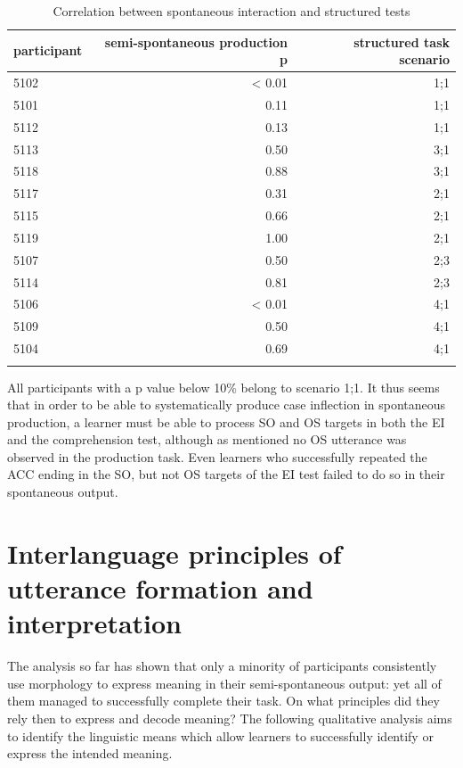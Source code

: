 \begin{table}
    \begin{tabularx}{\textwidth}{Xrr}
        \lsptoprule
         participant & semi-spontaneous production p & structured task scenario\\
         \midrule
         5102 & < 0.01 & 1;1\\
         5101 & 0.11 & 1;1\\
         5112 & 0.13 & 1;1\\
         5113 & 0.50 & 3;1\\
         5118 & 0.88 & 3;1\\
         5117 & 0.31 & 2;1\\
         5115 & 0.66 & 2;1\\
         5119 & 1.00 & 2;1\\
         5107 & 0.50 & 2;3\\
         5114 & 0.81 & 2;3\\
         5106 & < 0.01 & 4;1\\
         5109 & 0.50 & 4;1\\
         5104 & 0.69 & 4;1\\
        \lspbottomrule
    \end{tabularx}
    \caption{Correlation between spontaneous interaction and structured tests}
    \label{tab:07:6}
\end{table}

All participants with a p value below 10\% belong to scenario 1;1. It thus seems that in order to be able to systematically produce case inflection in spontaneous production, a learner must be able to process SO and OS targets in both the EI and the comprehension test, although as mentioned no OS utterance was observed in the production task. Even learners who successfully repeated the ACC ending in the SO, but not OS targets of the EI test failed to do so in their spontaneous output.

\section{Interlanguage principles of utterance formation and interpretation}\label{sec:07:5}

The analysis so far has shown that only a minority of participants consistently use morphology to express meaning in their semi-spontaneous output: yet all of them managed to successfully complete their task. On what principles did they rely then to express and decode meaning? The following qualitative analysis aims to identify the linguistic means which allow learners to successfully identify or express the intended meaning.

